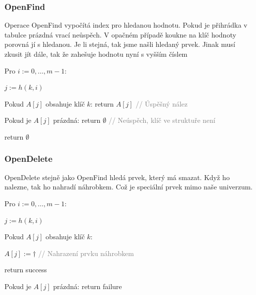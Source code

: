 \subsubsection{OpenFind}

Operace OpenFind vypočítá index pro hledanou hodnotu. Pokud je přihrádka v tabulce prázdná vrací neůspěch. V opačném případě koukne na klíč hodnoty porovná jí s hledanou. Je li stejná, tak jsme našli hledaný prvek. Jinak musí zkusit jít dále, tak že zahešuje hodnotu nyní s vyšším číslem

\medskip

\begin{pseudocode}
\item Pro $i := 0, \dots, m-1$:
\item \tab $j := h(k, i)$
\item \tab Pokud $A[j]$ obsahuje klíč $k$: return $A[j]$ \textcolor{gray}{// Úspěšný nález}
\item \tab Pokud je $A[j]$ prázdná: return $\emptyset$ \textcolor{gray}{// Neúspěch, klíč ve struktuře není}
\item return $\emptyset$
\end{pseudocode}

\bigskip

\subsubsection{OpenDelete}

OpenDelete stejně jako OpenFind hledá prvek, který má smazat. Když ho nalezne, tak ho nahradí náhrobkem. Což je speciální prvek mimo naše univerzum.

\medskip

\begin{pseudocode}
\item Pro $i := 0, \dots, m-1$:
\item \tab $j := h(k, i)$
\item \tab Pokud $A[j]$ obsahuje klíč $k$:
\item \tab \tab $A[j] := \dagger$ \textcolor{gray}{// Nahrazení prvku náhrobkem}
\item \tab \tab return success
\item \tab Pokud je $A[j]$ prázdná: return failure
\end{pseudocode}

\medskip

